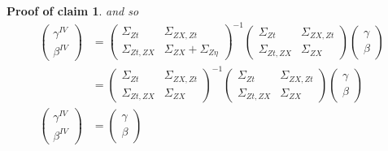 \documentclass[10pt]{article}
\newtheorem{claimproof}{Proof of claim}[claim]
\begin{document}
\begin{claimproof}
                and so
                \begin{align}
                    \left(\begin{array}{l}
                {\gamma}^{IV} \\
                {\beta}^{IV}
                \end{array}\right)
                & =\left(\begin{array}{cc}
                {\Sigma}_{Zt} & \Sigma_{ZX,Zt} \\
                \Sigma_{Zt,ZX}& {\Sigma}_{ZX}+{\Sigma}_{Z\eta}
                \end{array}\right)^{-1}\left(\begin{array}{cc}
                {\Sigma}_{Zt} & \Sigma_{ZX,Zt} \\
                \Sigma_{Zt,ZX} & {\Sigma}_{ZX}
                \end{array}\right)\left(\begin{array}{l}
                {\gamma} \\
                {\beta}
                \end{array}\right)\\
                & =\left(\begin{array}{cc}
                {\Sigma}_{Zt} & \Sigma_{ZX,Zt} \\
                \Sigma_{Zt,ZX}& {\Sigma}_{ZX}
                \end{array}\right)^{-1}\left(\begin{array}{cc}
                {\Sigma}_{Zt} & \Sigma_{ZX,Zt} \\
                \Sigma_{Zt,ZX} & {\Sigma}_{ZX}
                \end{array}\right)\left(\begin{array}{l}
                {\gamma} \\
                {\beta}
                \end{array}\right) \\
                \left(\begin{array}{l}
                {\gamma}^{IV} \\
                {\beta}^{IV}
                \end{array}\right)
                & =\left(\begin{array}{l}
                {\gamma} \\
                {\beta}
                \end{array}\right)
                \end{align}
                

\end{claimproof}
\end{document}

